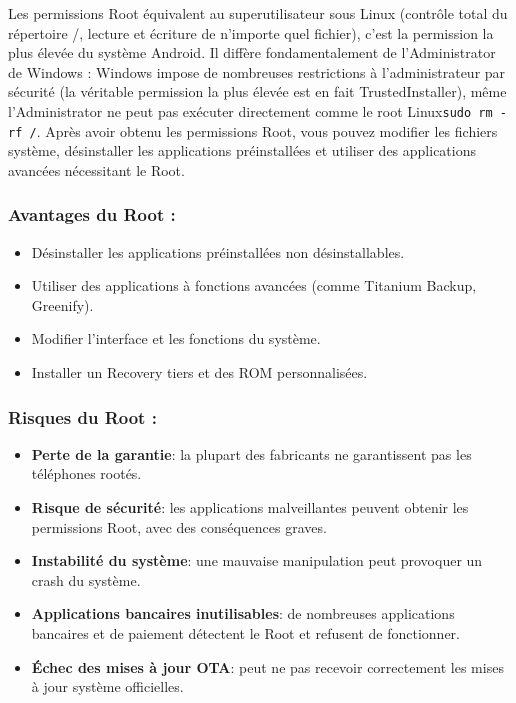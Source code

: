 
Les permissions Root équivalent au superutilisateur sous Linux (contrôle total du répertoire /, lecture et écriture de n'importe quel fichier), c'est la permission la plus élevée du système Android. Il diffère fondamentalement de l'Administrator de Windows : Windows impose de nombreuses restrictions à l'administrateur par sécurité (la véritable permission la plus élevée est en fait TrustedInstaller), même l'Administrator ne peut pas exécuter directement comme le root Linux\texttt{sudo rm -\allowbreak rf /\allowbreak *}. Après avoir obtenu les permissions Root, vous pouvez modifier les fichiers système, désinstaller les applications préinstallées et utiliser des applications avancées nécessitant le Root.

\subsubsection*{Avantages du Root :}

\begin{itemize}
  \item Désinstaller les applications préinstallées non désinstallables.
  \item Utiliser des applications à fonctions avancées (comme Titanium Backup, Greenify).
  \item Modifier l'interface et les fonctions du système.
  \item Installer un Recovery tiers et des ROM personnalisées.
\end{itemize}

\subsubsection*{Risques du Root :}

\begin{itemize}
  \item \textbf{Perte de la garantie}: la plupart des fabricants ne garantissent pas les téléphones rootés.
  \item \textbf{Risque de sécurité}: les applications malveillantes peuvent obtenir les permissions Root, avec des conséquences graves.
  \item \textbf{Instabilité du système}: une mauvaise manipulation peut provoquer un crash du système.
  \item \textbf{Applications bancaires inutilisables}: de nombreuses applications bancaires et de paiement détectent le Root et refusent de fonctionner.
  \item \textbf{Échec des mises à jour OTA}: peut ne pas recevoir correctement les mises à jour système officielles.
\end{itemize}

